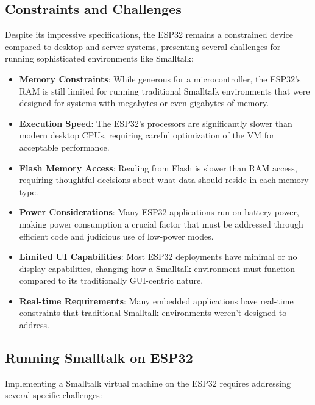 \documentclass[12pt,a4paper]{report}
\begin{document}
\subsection{Constraints and Challenges}
Despite its impressive specifications, the ESP32 remains a constrained device compared to desktop and server systems, presenting several challenges for running sophisticated environments like Smalltalk:

\begin{itemize}
    \item \textbf{Memory Constraints}: While generous for a microcontroller, the ESP32's RAM is still limited for running traditional Smalltalk environments that were designed for systems with megabytes or even gigabytes of memory.
    
    \item \textbf{Execution Speed}: The ESP32's processors are significantly slower than modern desktop CPUs, requiring careful optimization of the VM for acceptable performance.
    
    \item \textbf{Flash Memory Access}: Reading from Flash is slower than RAM access, requiring thoughtful decisions about what data should reside in each memory type.
    
    \item \textbf{Power Considerations}: Many ESP32 applications run on battery power, making power consumption a crucial factor that must be addressed through efficient code and judicious use of low-power modes.
    
    \item \textbf{Limited UI Capabilities}: Most ESP32 deployments have minimal or no display capabilities, changing how a Smalltalk environment must function compared to its traditionally GUI-centric nature.
    
    \item \textbf{Real-time Requirements}: Many embedded applications have real-time constraints that traditional Smalltalk environments weren't designed to address.
\end{itemize}

\subsection{Running Smalltalk on ESP32}
Implementing a Smalltalk virtual machine on the ESP32 requires addressing several specific challenges:
\end{document}
